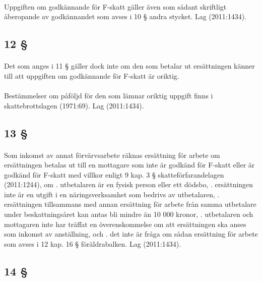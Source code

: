 \documentclass[a4paper,notitlepage,openany,10pt]{book}
\begin{document}
\paragraph*{}
Uppgiften om godkännande för F-skatt gäller även som sådant skriftligt åberopande av godkännandet som avses i 10 § andra stycket.
Lag (2011:1434).
\subsection*{12 §}
\paragraph*{}
Det som anges i 11 § gäller dock inte om den som betalar ut ersättningen känner till att uppgiften om godkännande för F-skatt är oriktig.
\paragraph*{}
Bestämmelser om påföljd för den som lämnar oriktig uppgift finns i skattebrottslagen (1971:69).
Lag (2011:1434).
\subsection*{13 §}
\paragraph*{}
Som inkomst av annat förvärvsarbete räknas ersättning för arbete om ersättningen betalas ut till en mottagare som inte är godkänd för F-skatt eller är godkänd för F-skatt med villkor enligt 9 kap. 3 § skatteförfarandelagen (2011:1244), om
. utbetalaren är en fysisk person eller ett dödsbo,
. ersättningen inte är en utgift i en näringsverksamhet som bedrivs av utbetalaren,
. ersättningen tillsammans med annan ersättning för arbete från samma utbetalare under beskattningsåret kan antas bli mindre än 10 000 kronor,
. utbetalaren och mottagaren inte har träffat en överenskommelse om att ersättningen ska anses som inkomst av anställning, och
. det inte är fråga om sådan ersättning för arbete som avses i 12 kap. 16 § föräldrabalken.
Lag (2011:1434).
\subsection*{14 §}
\end{document}
